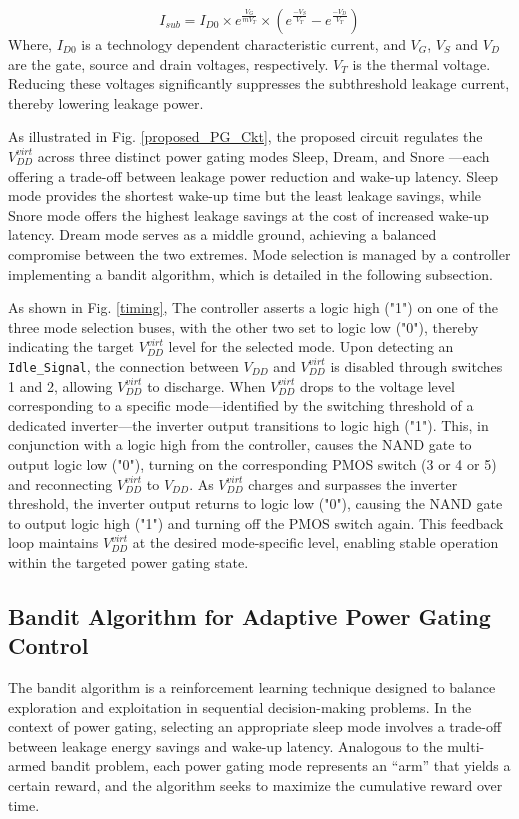 \documentclass[conference]{IEEEtran}
\begin{document}
\begin{equation}
    I_{sub} = I_{D0} \times e^{\frac{V_G}{mV_T}} \times (e^{\frac{-V_S}{V_T}} - e^{\frac{-V_D}{V_T}})
\end{equation}
Where, $I_{D0}$ is a technology dependent characteristic current, and $V_G$, $V_S$ and $V_D$ are the gate, source and drain voltages, respectively. $V_T$ is the thermal voltage. Reducing these voltages significantly suppresses the subthreshold leakage current, thereby lowering leakage power.

As illustrated in Fig. \ref{proposed_PG_Ckt}, the proposed circuit regulates the $V_{DD}^{virt}$ across three distinct power gating modes Sleep, Dream, and Snore —each offering a trade-off between leakage power reduction and wake-up latency. Sleep mode provides the shortest wake-up time but the least leakage savings, while Snore mode offers the highest leakage savings at the cost of increased wake-up latency. Dream mode serves as a middle ground, achieving a balanced compromise between the two extremes. Mode selection is managed by a controller implementing a bandit algorithm, which is detailed in the following subsection.

As shown in Fig. \ref{timing}, The controller asserts a logic high ("1") on one of the three mode selection buses, with the other two set to logic low ("0"), thereby indicating the target $V_{DD}^{virt}$ level for the selected mode. Upon detecting an \texttt{Idle\_Signal}, the connection between $V_{DD}$ and $V_{DD}^{virt}$ is disabled through switches 1 and 2, allowing $V_{DD}^{virt}$ to discharge. When $V_{DD}^{virt}$ drops to the voltage level corresponding to a specific mode—identified by the switching threshold of a dedicated inverter—the inverter output transitions to logic high ("1"). This, in conjunction with a logic high from the controller, causes the NAND gate to output logic low ("0"), turning on the corresponding PMOS switch (3 or 4 or 5) and reconnecting $V_{DD}^{virt}$ to $V_{DD}$. As $V_{DD}^{virt}$ charges and surpasses the inverter threshold, the inverter output returns to logic low ("0"), causing the NAND gate to output logic high ("1") and turning off the PMOS switch again. This feedback loop maintains $V_{DD}^{virt}$ at the desired mode-specific level, enabling stable operation within the targeted power gating state.


\subsection{Bandit Algorithm for Adaptive Power Gating Control}
\label{The bandit Algorithm and how it's applied}
The bandit algorithm is a reinforcement learning technique designed to balance exploration and exploitation in sequential decision-making problems. In the context of power gating, selecting an appropriate sleep mode involves a trade-off between leakage energy savings and wake-up latency. Analogous to the multi-armed bandit problem, each power gating mode represents an ``arm'' that yields a certain reward, and the algorithm seeks to maximize the cumulative reward over time.
\end{document}
